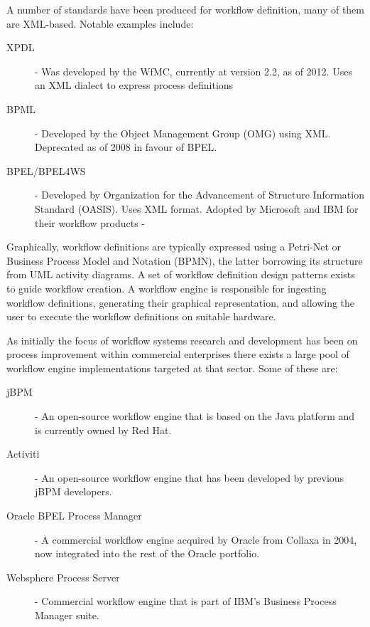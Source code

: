 

A number of standards have been produced for workflow definition, many of them are XML-based\autocite{shapiro2002technical}. Notable examples include:

\begin{description}
\item[XPDL] - Was developed by the WfMC, currently at version 2.2, as of 2012. Uses an XML dialect to express process definitions
\item[BPML] - Developed by the Object Management Group (OMG) using XML. Deprecated as of 2008 in favour of BPEL.
\item[BPEL/BPEL4WS] -  Developed by Organization for the Advancement of Structure Information Standard (OASIS). Uses XML format. Adopted by Microsoft and IBM for their workflow products - 
\end{description} 

Graphically, workflow definitions are typically expressed using a Petri-Net\autocite{peterson1981petri} or Business Process Model and Notation (BPMN), the latter borrowing its structure from UML activity diagrams. A set of workflow definition design patterns exists to guide workflow creation\autocite{van2003workflow}. A workflow engine is responsible for ingesting workflow definitions, generating their graphical representation, and allowing the user to execute the workflow definitions on suitable hardware.

As initially the focus of workflow systems research and development has been on process improvement within commercial enterprises there exists a large pool of workflow engine implementations targeted at that sector. Some of these are:

\begin{description}
\item[jBPM] - An open-source workflow engine that is based on the Java platform and is currently owned by Red Hat.
\item[Activiti] - An open-source workflow engine that has been developed by previous jBPM developers.
\item[Oracle BPEL Process Manager] - A commercial workflow engine acquired by Oracle from Collaxa in 2004, now integrated into the rest of the Oracle portfolio.
\item[Websphere Process Server] - Commercial workflow engine that is part of IBM's Business Process Manager suite.
\end{description}

